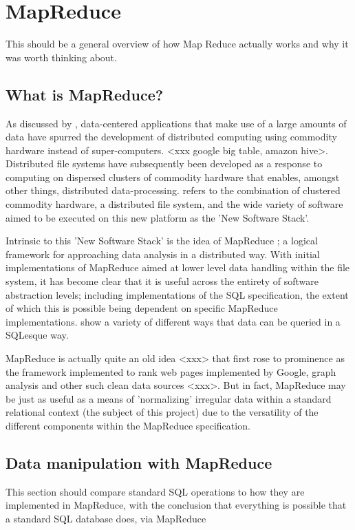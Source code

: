 % 

\section{MapReduce}
This should be a general overview of how Map Reduce actually works and why it was worth thinking about.

\subsection{What is MapReduce?}
As discussed by \cite{mining2011}, data-centered applications that make use of a large amounts of data have spurred the development of distributed computing using commodity hardware instead of super-computers. <xxx google big table, amazon hive>. Distributed file systems have subsequently been developed as a response to computing on dispersed clusters of commodity hardware that enables, amongst other things, distributed data-processing. \cite{mining2011} refers to the combination of clustered commodity hardware, a distributed file system, and the wide variety of software aimed to be executed on this new platform as the 'New Software Stack'.

Intrinsic to this 'New Software Stack' is the idea of MapReduce \cite{mining2011}; a logical framework for approaching data analysis in a distributed way. With initial implementations of MapReduce aimed at lower level data handling within the file system, it has become clear that it is useful across the entirety of software abstraction levels; including implementations of the SQL specification, the extent of which this is possible being dependent on specific MapReduce implementations. \cite{mining2011} show a variety of different ways that data can be queried in a SQLesque way.

MapReduce is actually quite an old idea <xxx> that first rose to prominence as the framework implemented to rank web pages implemented by Google, graph analysis and other such clean data sources <xxx>. But in fact, MapReduce may be just as useful as a means of 'normalizing' irregular data within a standard relational context (the subject of this project) due to the versatility of the different components within the MapReduce specification.


\subsection{Data manipulation with MapReduce}
This section should compare standard SQL operations to how they are implemented in MapReduce, with the conclusion that everything is possible that a standard SQL database does, via MapReduce

